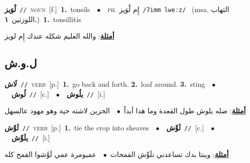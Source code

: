 \documentclass[10pt,a4paper,twoside]{article} %
\begin{document}
\begin{multicols}{2}
{\setlength\topsep{0pt}\textbf{\foreignlanguage{arabic}{لْوَيز}}\ {\color{gray}\texttt{//}\color{black}}\ \textsc{noun}\ [f.]\ \textbf{1.}~tonsils\ \ $\bullet$\ \ \textsc{ph.} \color{gray} \foreignlanguage{arabic}{إِم لْوَيز}\color{black}\ {\color{gray}\texttt{/{\sffamily ʔimm lweːz}/}\color{black}}\ \color{gray} (msa. \foreignlanguage{arabic}{التهاب اللوزتين}~\foreignlanguage{arabic}{\textbf{١.}})\color{black}\ \textbf{1.}~tonsillitis\  \begin{flushright}\color{gray}\foreignlanguage{arabic}{\textbf{\underline{\foreignlanguage{arabic}{أمثلة}}}: والله العليم شكله عندك إِم لويز}\end{flushright}\color{black}} \vspace{2mm}

\vspace{-3mm}
\subsection*{\color{blue}\foreignlanguage{arabic}{ل.و.ش}\color{blue}{}} 

{\setlength\topsep{0pt}\textbf{\foreignlanguage{arabic}{لَاش}}\ {\color{gray}\texttt{//}\color{black}}\ \textsc{verb}\ [p.]\ \textbf{1.}~go back and forth.  \textbf{2.}~loaf around.  \textbf{3.}~sting\ \ $\bullet$\ \ \setlength\topsep{0pt}\textbf{\foreignlanguage{arabic}{لُوش}}\ {\color{gray}\texttt{//}\color{black}}\ [c.]\ \ $\bullet$\ \ \setlength\topsep{0pt}\textbf{\foreignlanguage{arabic}{يلُوش}}\ {\color{gray}\texttt{//}\color{black}}\ [i.]\  \begin{flushright}\color{gray}\foreignlanguage{arabic}{\textbf{\underline{\foreignlanguage{arabic}{أمثلة}}}: ضله يلوش طول القعدة وما هدا أبداً\ $\bullet$\ \  الحزين لاشته حية وهو مهود عالسهل}\end{flushright}\color{black}} \vspace{2mm}

{\setlength\topsep{0pt}\textbf{\foreignlanguage{arabic}{لَوَّش}}\ {\color{gray}\texttt{//}\color{black}}\ \textsc{verb}\ [p.]\ \textbf{1.}~tie the crop into sheaves\ \ $\bullet$\ \ \setlength\topsep{0pt}\textbf{\foreignlanguage{arabic}{لَوِّش}}\ {\color{gray}\texttt{//}\color{black}}\ [c.]\ \ $\bullet$\ \ \setlength\topsep{0pt}\textbf{\foreignlanguage{arabic}{يلَوِّش}}\ {\color{gray}\texttt{//}\color{black}}\ [i.]\  \begin{flushright}\color{gray}\foreignlanguage{arabic}{\textbf{\underline{\foreignlanguage{arabic}{أمثلة}}}: وينتا بدك تساعدني نلَوِّش القمحات\ $\bullet$\ \  عميومرة عمي لَوَّشوا القمح كله}\end{flushright}\color{black}} \vspace{2mm}


\end{multicols}
\end{document}
